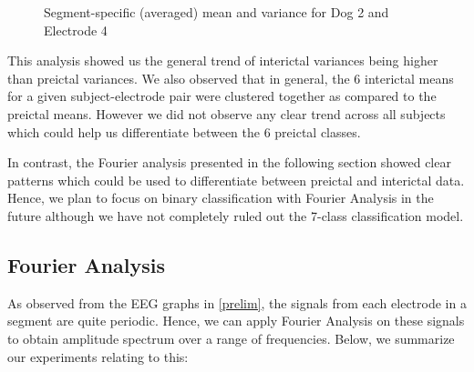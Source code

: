 \documentclass[a4paper]{article}
\begin{document}
\begin{figure}[H]
    \centering
    \qquad
    \caption{Segment-specific (averaged) mean and variance for Dog 2 and Electrode 4}%
    \label{fig:meanvar}%
\end{figure}

This analysis showed us the general trend of interictal variances being higher than preictal variances. We also observed that in general, the 6 interictal means for a given subject-electrode pair were clustered together as compared to the preictal means. However we did not observe any clear trend across all subjects which could help us differentiate between the 6 preictal classes.

In contrast, the Fourier analysis presented in the following section showed clear patterns which could be used to differentiate between preictal and interictal data. Hence, we plan to focus on binary classification with Fourier Analysis in the future although we have not completely ruled out the 7-class classification model.

\subsection{Fourier Analysis}
As observed from the EEG graphs in \ref{prelim}, the signals from each electrode in a segment are quite periodic. Hence, we can apply Fourier Analysis on these signals to obtain amplitude spectrum over a range of frequencies. Below, we summarize our experiments relating to this: 
\end{document}
